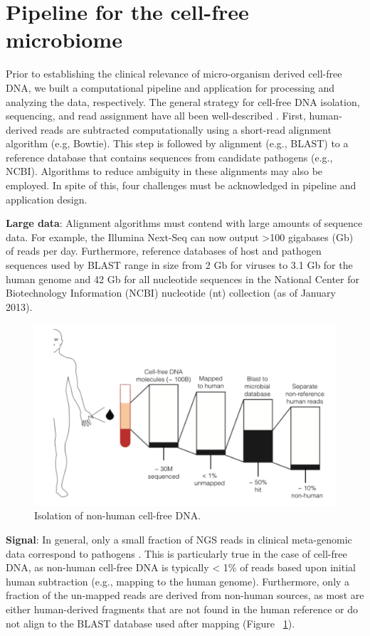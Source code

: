 \section{Pipeline for the cell-free microbiome}

Prior to establishing the clinical relevance of micro-organism derived cell-free DNA, we built a computational pipeline and application for processing and analyzing the data, respectively. The general strategy for cell-free DNA isolation, sequencing, and read assignment have all been well-described \cite{DeVlaminck:2013hl}. First, human-derived reads are subtracted computationally using a short-read alignment algorithm (e.g, Bowtie). This step is followed by alignment (e.g., BLAST) to a reference database that contains sequences from candidate pathogens (e.g., NCBI). Algorithms to reduce ambiguity in these alignments \cite{Xia:2011it} may also be employed. In spite of this, four challenges must be acknowledged in pipeline and application design.

\textbf{Large data}: Alignment algorithms must contend with large amounts of sequence data. For example, the Illumina Next-Seq can now output >100 gigabases (Gb) of reads per day. Furthermore, reference databases of host and pathogen sequences used by BLAST range in size from 2 Gb for viruses to 3.1 Gb for the human genome and 42 Gb for all nucleotide sequences in the National Center for Biotechnology Information (NCBI) nucleotide (nt) collection (as of January 2013). 

\begin{figure}
\center\includegraphics[width=120mm,scale=0.5]{Figures/Fig3}
\caption{Isolation of non-human cell-free DNA.}
\label{fig:Fig3}
\end{figure}

\textbf{Signal}: In general, only a small fraction of NGS reads in clinical meta-genomic data correspond to pathogens \cite{Naccache:2014gk}. This is particularly true in the case of cell-free DNA, as non-human cell-free DNA is typically < 1\% of reads based upon initial human subtraction (e.g., mapping to the human genome). Furthermore, only a fraction of the un-mapped reads are derived from non-human sources, as most are either human-derived fragments that are not found in the human reference or do not align to the BLAST database used after mapping (Figure ~\ref{fig:Fig3}). 

